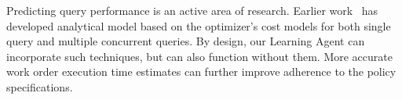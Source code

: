 Predicting query performance is an active area of research. 
Earlier work~\cite{wu2013towards, wu2014uncertainty, duggan2011performance} has developed analytical model based on the optimizer's cost models for both single query and multiple concurrent queries.
By design, our Learning Agent can incorporate such techniques, but can also function without them. 
More accurate work order execution time estimates can further improve adherence to the policy specifications.


